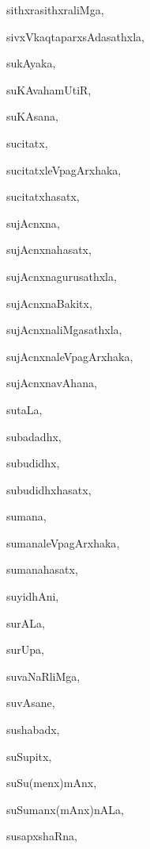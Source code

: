 \begin{multicols}{2}
{sithxrasithxraliMga}, \pageref{sithxrasithxraliMga}

{sivxVkaqtaparxsAdasathxla}, \pageref{sivxVkaqtaparxsAdasathxla}

{sukAyaka}, \pageref{sukAyaka}

{suKAvahamUtiR}, \pageref{suKAvahamUtiR}

{suKAsana}, \pageref{suKAsana}

{sucitatx}, \pageref{sucitatx}

{sucitatxleVpagArxhaka}, \pageref{sucitatxleVpagArxhaka}

{sucitatxhasatx}, \pageref{sucitatxhasatx}

{sujAcnxna}, \pageref{sujAcnxna}

{sujAcnxnahasatx}, \pageref{sujAcnxnahasatx}

{sujAcnxnagurusathxla}, \pageref{sujAcnxnagurusathxla}

{sujAcnxnaBakitx}, \pageref{sujAcnxnaBakitx}

{sujAcnxnaliMgasathxla}, \pageref{sujAcnxnaliMgasathxla}

{sujAcnxnaleVpagArxhaka}, \pageref{sujAcnxnaleVpagArxhaka}

{sujAcnxnavAhana}, \pageref{sujAcnxnavAhana}

{sutaLa}, \pageref{sutaLa}

{subadadhx}, \pageref{subadadhx}

{subudidhx}, \pageref{subudidhx}

{subudidhxhasatx}, \pageref{subudidhxhasatx}

{sumana}, \pageref{sumana}

{sumanaleVpagArxhaka}, \pageref{sumanaleVpagArxhaka}

{sumanahasatx}, \pageref{sumanahasatx}

{suyidhAni}, \pageref{suyidhAni}

{surALa}, \pageref{surALa}

{surUpa}, \pageref{surUpa}

{suvaNaRliMga}, \pageref{suvaNaRliMga}

{suvAsane}, \pageref{suvAsane}

{sushabadx}, \pageref{sushabadx}

{suSupitx}, \pageref{suSupitx}

{suSu(menx)mAnx}, \pageref{suSumenxmAnx}

{suSumanx(mAnx)nALa}, \pageref{suSumanxmAnxnALa}

{susapxshaRna}, \pageref{susapxshaRna}


\end{multicols}
